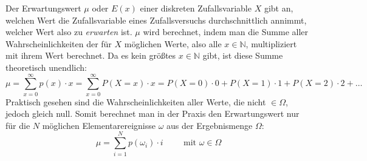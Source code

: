 \begin{figure}[h!]
	\centering
\end{figure}


Der Erwartungswert $\mu$ oder $E(x)$ einer diskreten Zufallsvariable $X$ gibt an, welchen Wert die Zufallsvariable eines Zufallsversuchs durchschnittlich annimmt, welcher Wert also zu \emph{erwarten} ist. $\mu$ wird berechnet, indem man die Summe aller Wahrscheinlichkeiten der f\"{u}r $X$ m\"{o}glichen Werte, also alle $x \in \mathbb{N}$, multipliziert mit ihrem Wert berechnet. Da es kein gr\"{o}\ss{}tes $x \in \mathbb{N}$ gibt, ist diese Summe theoretisch unendlich: $$\mu = \sum_{x=0}^{\infty} p(x) \cdot x = \sum_{x=0}^{\infty} P(X = x) \cdot x = P(X = 0) \cdot 0 + P(X = 1) \cdot 1 + P(X = 2) \cdot 2 + \dots$$ Praktisch gesehen sind die Wahrscheinlichkeiten aller Werte, die nicht $\in \Omega$, jedoch gleich null. Somit berechnet man in der Praxis den Erwartungswert nur f\"{u}r die $N$ m\"{o}glichen Elementarereignisse $\omega$ aus der Ergebnismenge $\Omega$: $$\mu = \sum_{i=1}^{N} p(\omega_i) \cdot i \hspace{1cm} \text{mit } \omega \in \Omega$$



